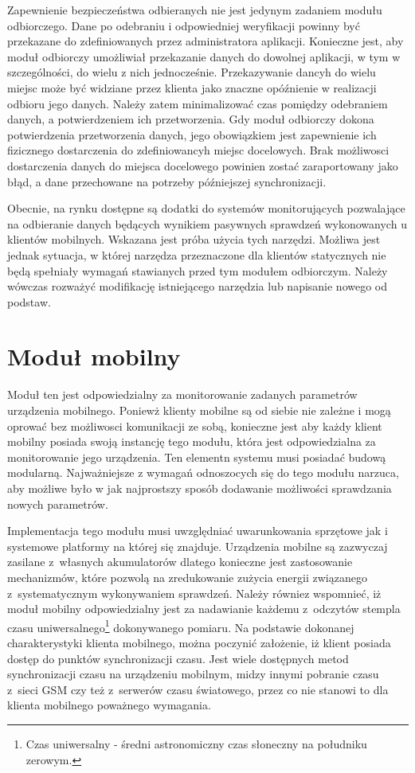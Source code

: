 Zapewnienie bezpieczeństwa odbieranych nie jest jedynym zadaniem
modułu odbiorczego. Dane po odebraniu i odpowiedniej weryfikacji
powinny być przekazane do zdefiniowanych przez administratora
aplikacji. Konieczne jest, aby moduł odbiorczy umożliwiał przekazanie
danych do dowolnej aplikacji, w tym w szczególności, do wielu z nich
jednocześnie. Przekazywanie dancyh do wielu miejsc może być widziane
przez klienta jako znaczne opóźnienie w realizacji odbioru jego
danych. Należy zatem minimalizować czas pomiędzy odebraniem danych, a
potwierdzeniem ich przetworzenia. Gdy moduł odbiorczy dokona
potwierdzenia przetworzenia danych, jego obowiązkiem jest zapewnienie
ich fizicznego dostarczenia do zdefiniowancyh miejsc docelowych. Brak
możliwosci dostarczenia danych do miejsca docelowego powinien zostać
zaraportowany jako błąd, a dane przechowane na potrzeby późniejszej
synchronizacji.

Obecnie, na rynku dostępne są dodatki do systemów monitorujących
pozwalające na odbieranie danych będących wynikiem pasywnych sprawdzeń
wykonowanych u klientów mobilnych. Wskazana jest próba użycia tych
narzędzi. Możliwa jest jednak sytuacja, w której narzędza przeznaczone
dla klientów statycznych nie będą spełniały wymagań stawianych przed
tym modułem odbiorczym. Należy wówczas rozważyć modifikację
istniejącego narzędzia lub napisanie nowego od podstaw.


\section[Moduł mobilny][Moduł mobilny]{Moduł mobilny}

Moduł ten jest odpowiedzialny za monitorowanie zadanych parametrów
urządzenia mobilnego. Poniewż klienty mobilne są od siebie nie zależne
i mogą oprować bez możliwosci komunikacji ze sobą, konieczne jest aby
każdy klient mobilny posiada swoją instancję tego modułu, która jest
odpowiedzialna za monitorowanie jego urządzenia. Ten elementn systemu
musi posiadać budową modularną. Najważniejsze z wymagań
odnoszocych się do tego modułu narzuca, aby możliwe było w jak
najprostszy sposób dodawanie możliwości sprawdzania nowych parametrów.

Implementacja tego modułu musi uwzględniać uwarunkowania sprzętowe jak
i systemowe platformy na której się znajduje. Urządzenia mobilne są
zazwyczaj zasilane z~własnych akumulatorów dlatego konieczne jest
zastosowanie mechanizmów, które pozwolą na zredukowanie zużycia
energii związanego z~systematycznym wykonywaniem sprawdzeń. Należy
równiez wspomnieć, iż moduł mobilny odpowiedzialny jest za nadawianie
każdemu z~odczytów stempla czasu uniwersalnego\footnote{Czas
  uniwersalny - średni astronomiczny czas słoneczny na południku
  zerowym.} dokonywanego pomiaru. Na podstawie dokonanej
charakterystyki klienta mobilnego, można poczynić założenie, iż klient
posiada dostęp do punktów synchronizacji czasu. Jest wiele dostępnych
metod synchronizacji czasu na urządzeniu mobilnym, midzy innymi
pobranie czasu z~sieci GSM czy też z~serwerów czasu światowego, przez
co nie stanowi to dla klienta mobilnego poważnego wymagania. 

